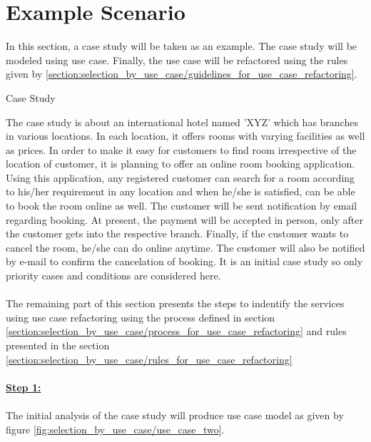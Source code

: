 \section{Example Scenario}\label{section:selection_by_use_case/refactoring_example}
In this section, a case study will be taken as an example. The case study will be modeled using use case. Finally, the use case will be refactored using the rules given by \ref{section:selection_by_use_case/guidelines_for_use_case_refactoring}.
\\
\begin{shaded} Case Study \end{shaded}
The case study is about an international hotel named 'XYZ' which has branches in various locations. In each location, it offers rooms with varying facilities as well as prices. In order to make it easy for customers to find room irrespective of the location of customer, it is planning to offer an online room booking application. Using this application, any registered customer can search for a room according to his/her requirement in any location and when he/she is satisfied, can be able to book the room online as well. The customer will be sent notification by email regarding booking. At present, the payment will be accepted in person, only after the customer gets into the respective branch. Finally, if the customer wants to cancel the room, he/she can do online anytime. The customer will also be notified by e-mail to confirm the cancelation of booking. It is an initial case study so only priority cases and conditions are considered here.
\\
\\
The remaining part of this section presents the steps to indentify the services using use case refactoring using the process defined in section \ref{section:selection_by_use_case/process_for_use_case_refactoring} and rules presented in the section \ref{section:selection_by_use_case/rules_for_use_case_refactoring}
\\
\\
\textbf{\underline{Step 1:}}
\\
\\
The initial analysis of the case study will produce use case model as given by figure \ref{fig:selection_by_use_case/use_case_two}.

